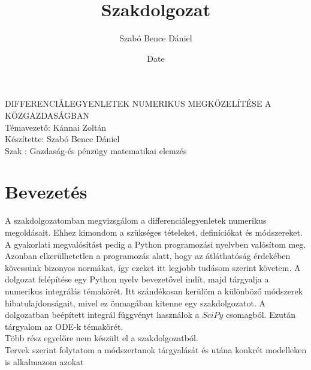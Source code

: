 \documentclass{article}
\title{Szakdolgozat}
\author{Szabó Bence Dániel }
\date{Date}
\theoremstyle{definition}
\theoremstyle{theorem}
\begin{document}
\begin{center}
\fontsize{40pt}{12pt}\selectfont
    
    DIFFERENCIÁLEGYENLETEK NUMERIKUS MEGKÖZELÍTÉSE A KÖZGAZDASÁGBAN\\
    \bigskip
    Témavezető: Kánnai Zoltán\\
    \bigskip
    Készítette: Szabó Bence Dániel\\
    \bigskip
    Szak : Gazdaság-és pénzügy matematikai elemzés
\end{center}

\pagebreak
\tableofcontents
\section{Bevezetés}
A szakdolgozatomban megvizsgálom a differenciálegyenletek numerikus megoldásait. Ehhez kimondom a szükséges tételeket, definíciókat és módszereket. A gyakorlati megvalósítást pedig a Python programozási nyelvben valósítom meg. Azonban elkerülhetetlen a programozás alatt, hogy az átláthatóság érdekében kövessünk bizonyos normákat, így ezeket itt legjobb tudásom szerint követem. A dolgozat felépítése egy Python nyelv bevezetővel indít, majd tárgyalja a numerikus integrálás témakörét. Itt szándékosan kerülöm a különböző módszerek hibatulajdonságait, mivel ez önmagában kitenne egy szakdolgozatot. A dolgozatban beépített integrál függvényt használok a $\textit{SciPy}$ csomagból. Ezután tárgyalom az ODE-k témakörét.\\

Több rész egyelőre nem készült el a szakdolgozatból.\\ Tervek szerint folytatom a módszertanok tárgyalását és utána konkrét modelleken is alkalmazom azokat
\end{document}
